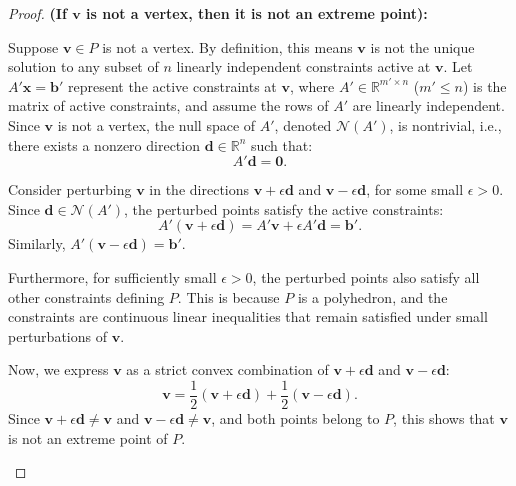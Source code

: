 \begin{proof}
\textbf{(If \( \mathbf{v} \) is not a vertex, then it is not an extreme point):}

Suppose \( \mathbf{v} \in P \) is not a vertex. By definition, this means \( \mathbf{v} \) is not the unique solution to any subset of \( n \) linearly independent constraints active at \( \mathbf{v} \). Let \( A' \mathbf{x} = \mathbf{b}' \) represent the active constraints at \( \mathbf{v} \), where \( A' \in \mathbb{R}^{m' \times n} \) (\( m' \leq n \)) is the matrix of active constraints, and assume the rows of \( A' \) are linearly independent. Since \( \mathbf{v} \) is not a vertex, the null space of \( A' \), denoted \( \mathcal{N}(A') \), is nontrivial, i.e., there exists a nonzero direction \( \mathbf{d} \in \mathbb{R}^n \) such that:
\[
A' \mathbf{d} = \mathbf{0}.
\]

Consider perturbing \( \mathbf{v} \) in the directions \( \mathbf{v} + \epsilon \mathbf{d} \) and \( \mathbf{v} - \epsilon \mathbf{d} \), for some small \( \epsilon > 0 \). Since \( \mathbf{d} \in \mathcal{N}(A') \), the perturbed points satisfy the active constraints:
\[
A' (\mathbf{v} + \epsilon \mathbf{d}) = A' \mathbf{v} + \epsilon A' \mathbf{d} = \mathbf{b}'.
\]
Similarly, \( A' (\mathbf{v} - \epsilon \mathbf{d}) = \mathbf{b}' \).

Furthermore, for sufficiently small \( \epsilon > 0 \), the perturbed points also satisfy all other constraints defining \( P \). This is because \( P \) is a polyhedron, and the constraints are continuous linear inequalities that remain satisfied under small perturbations of \( \mathbf{v} \).

Now, we express \( \mathbf{v} \) as a strict convex combination of \( \mathbf{v} + \epsilon \mathbf{d} \) and \( \mathbf{v} - \epsilon \mathbf{d} \):
\[
\mathbf{v} = \frac{1}{2} (\mathbf{v} + \epsilon \mathbf{d}) + \frac{1}{2} (\mathbf{v} - \epsilon \mathbf{d}).
\]
Since \( \mathbf{v} + \epsilon \mathbf{d} \neq \mathbf{v} \) and \( \mathbf{v} - \epsilon \mathbf{d} \neq \mathbf{v} \), and both points belong to \( P \), this shows that \( \mathbf{v} \) is not an extreme point of \( P \).


\begin{center}
\end{center}
\end{proof}
